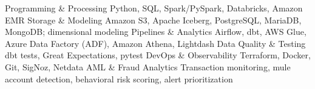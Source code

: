 
\begin{cvskills}
  \cvskill
    {Programming \& Processing}
    {Python, SQL, Spark/PySpark, Databricks, Amazon EMR}
  \cvskill
    {Storage \& Modeling}
    {Amazon S3, Apache Iceberg, PostgreSQL, MariaDB, MongoDB; dimensional modeling}
  \cvskill
    {Pipelines \& Analytics}
    {Airflow, dbt, AWS Glue, Azure Data Factory (ADF), Amazon Athena, Lightdash}
  \cvskill
    {Data Quality \& Testing}
    {dbt tests, Great Expectations, pytest}
  \cvskill
    {DevOps \& Observability}
    {Terraform, Docker, Git, SigNoz, Netdata}
  \cvskill
    {AML \& Fraud Analytics}
    {Transaction monitoring, mule account detection, behavioral risk scoring, alert prioritization}
\end{cvskills}
